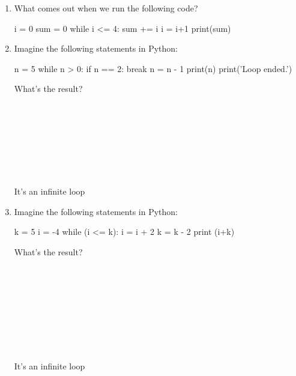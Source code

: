 \begin{enumerate}


\item What comes out when we run the following code?

\begin{python}
i = 0
sum = 0
while i <= 4:
    sum += i
    i = i+1
print(sum)
\end{python}

\begin{choices}
\end{choices}




\item Imagine the following statements in Python:


\begin{python}
n = 5
while n > 0:
    if n == 2:
        break
    n = n - 1
    print(n)
print('Loop ended.')
\end{python}

What's the result?

\begin{choices}
    \choice %
\\
\\
\\
    \choice 
{}\\
\\
\\
\\
    \choice It's an infinite loop
    \choice {}
\end{choices}

\item Imagine the following statements in Python:


\begin{python}
k = 5
i = -4
while (i <= k):
    i = i + 2
    k = k - 2
    print (i+k)
\end{python}

What's the result?

\begin{choices}
    \choice %
\\
\\
    \choice 
{}\\
\\
\\
\\
    \choice 
{}\\
\\
    \choice It's an infinite loop


\end{choices}
\end{enumerate}
